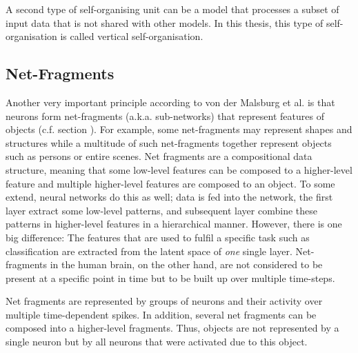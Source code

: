 \begin{implementation}
	A second type of self-organising unit can be a model that processes a subset of input data that is not shared with other models. In this thesis, this type of self-organisation is called vertical self-organisation.
\end{implementation}


\subsection{Net-Fragments}
Another very important principle according to von der Malsburg et al. \cite{von_der_Malsburg_Stadelmann_Grewe_2022} is that neurons form net-fragments (a.k.a. sub-networks) that represent features of objects (c.f. section ).
For example, some net-fragments may represent shapes and structures while a multitude of such net-fragments together represent objects such as persons or entire scenes.
Net fragments are a compositional data structure, meaning that some low-level features can be composed to a higher-level feature and multiple higher-level features are composed to an object.
To some extend, neural networks do this as well; data is fed into the network, the first layer extract some low-level patterns, and subsequent layer combine these patterns in higher-level features in a hierarchical manner.
However, there is one big difference: The features that are used to fulfil a specific task such as classification are extracted from the latent space of \emph{one} single layer.
Net-fragments in the human brain, on the other hand, are not considered to be present at a specific point in time but to be built up over multiple time-steps.

\begin{claim}
	Net fragments are represented by groups of neurons and their activity over multiple time-dependent spikes. In addition, several net fragments can be composed into a higher-level fragments. Thus, objects are not represented by a single neuron but by all neurons that were activated due to this object.
\end{claim}

